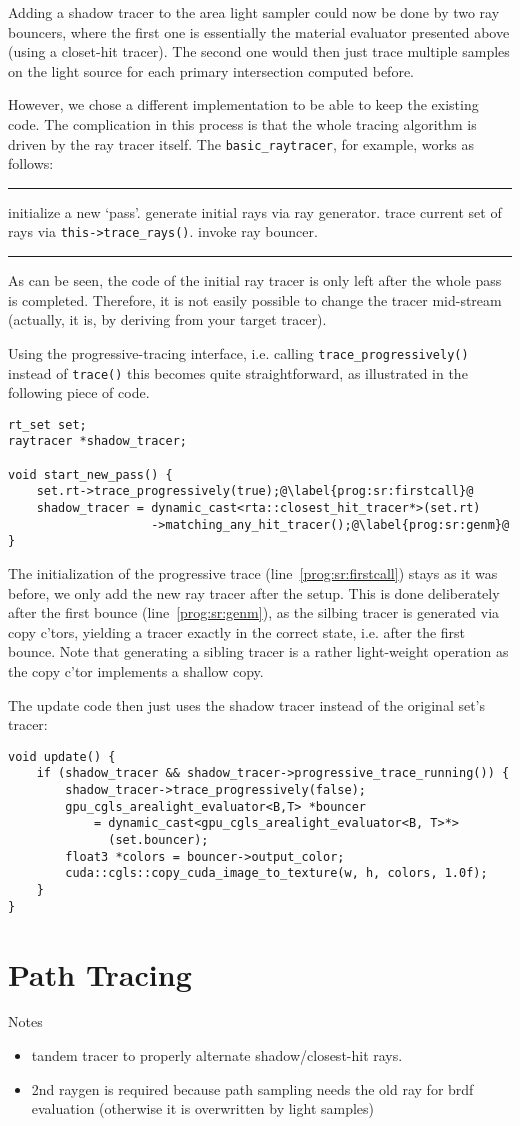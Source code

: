 \documentclass[a4paper,11pt]{scrartcl}
\newenvironment{alg}{
	\medskip\hrule
	\begin{algorithmic}}
	{\end{algorithmic}
	\hrule\medskip}
\begin{document}
Adding a shadow tracer to the area light sampler could now be done by two ray bouncers, 
	where the first one is essentially the material evaluator presented above (using a closet-hit tracer).
The second one would then just trace multiple samples on the light source for each primary intersection computed before.

However, we chose a different implementation to be able to keep the existing code.
The complication in this process is that the whole tracing algorithm is driven by the ray tracer itself.
The \lstinline|basic_raytracer|, for example, works as follows:
\begin{alg}
\State initialize a new `pass'.
\State generate initial rays via ray generator.
\Repeat
	\State trace current set of rays via \lstinline|this->trace_rays()|.
	\State invoke ray bouncer.
\end{alg}
As can be seen, the code of the initial ray tracer is only left after the whole pass is completed.
Therefore, it is not easily possible to change the tracer mid-stream
	(actually, it is, by deriving from your target tracer).

Using the progressive-tracing interface, i.e. calling \lstinline|trace_progressively()| instead of \lstinline|trace()|
	this becomes quite straightforward, as illustrated in the following piece of code.
\begin{lstlisting}
rt_set set;
raytracer *shadow_tracer;

void start_new_pass() {
	set.rt->trace_progressively(true);@\label{prog:sr:firstcall}@
	shadow_tracer = dynamic_cast<rta::closest_hit_tracer*>(set.rt)
	                ->matching_any_hit_tracer();@\label{prog:sr:genm}@
}
\end{lstlisting}
The initialization of the progressive trace (line~\ref{prog:sr:firstcall}) stays as it was before,
	we only add the new ray tracer after the setup.
This is done deliberately after the first bounce (line~\ref{prog:sr:genm}), as the silbing tracer is generated via copy c'tors, 
	yielding a tracer exactly in the correct state, i.e. after the first bounce.
Note that generating a sibling tracer is a rather light-weight operation as the copy c'tor implements a shallow copy.

The update code then just uses the shadow tracer instead of the original set's tracer:
\begin{lstlisting}
void update() {
	if (shadow_tracer && shadow_tracer->progressive_trace_running()) {
		shadow_tracer->trace_progressively(false);
		gpu_cgls_arealight_evaluator<B,T> *bouncer 
			= dynamic_cast<gpu_cgls_arealight_evaluator<B, T>*>
			  (set.bouncer);
		float3 *colors = bouncer->output_color;
		cuda::cgls::copy_cuda_image_to_texture(w, h, colors, 1.0f);
	}
}
\end{lstlisting}


\section{Path Tracing}
Notes
\begin{itemize}
\item tandem tracer to properly alternate shadow/closest-hit rays.
\item 2nd raygen is required because path sampling needs the old ray for brdf evaluation
	(otherwise it is overwritten by light samples)
\end{itemize}
\end{document}
